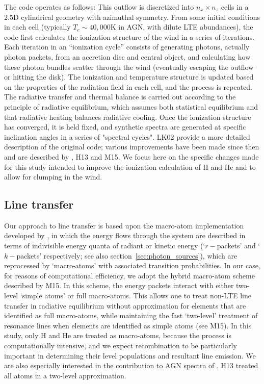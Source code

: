 \documentclass[useAMS,usenatbib]{mn2e_x}
\begin{document}
The code operates as follows:   This outflow is discretized into $n_x \times n_z$ cells in a 2.5D
cylindrical geometry with azimuthal symmetry. 
From some initial conditions in each cell (typically $T_e \sim 40,000$K in AGN, with 
dilute LTE abundances), 
the code first calculates the ionization structure of the wind in a series of iterations. 
Each iteration in an ``ionization cycle'' consists of generating photons, actually photon packets, 
from an accretion disc and central object, and calculating how these photon 
bundles scatter through the wind (eventually escaping the outflow or hitting the disk). 
The ionization and temperature structure is updated based on the properties of the 
radiation field in each cell, and the process is repeated. The radiative transfer and thermal
balance is carried out according to the principle of radiative equilibrium, 
which assumes both statistical equilibrium and that radiative heating balances radiative cooling.
Once the ionization structure has converged, it is held fixed, 
and synthetic spectra are generated at specific inclination 
angles in a series of "spectral cycles". LK02 provide a more detailed  
description of the original code; various improvements have been made 
since then and are described by \cite{simmacro2005}, H13 and M15.  
We focus here on the specific changes made for this study
intended to improve the ionization calculation of H and He
and to allow for clumping in the wind.


\subsection{Line transfer}

Our approach to line transfer is based upon the macro-atom implementation developed by 
\cite{lucy2002, lucy2003}, in which the energy flows through the system are described in 
terms of indivisible energy quanta of radiant or kinetic energy 
(`$r-$packets' and `$k-$packets' respectively; see also section~\ref{sec:photon_sources}),
which are reprocessed by `macro-atoms' with associated transition probabilities.
In our case, for reasons of computational efficiency, we adopt the  hybrid macro-atom scheme 
described by M15. In this scheme, the energy packets interact with either two-level 
`simple atoms' or full macro-atoms. 
This allows one to treat non-LTE line transfer in radiative equilibrium
without approximation for elements that are identified as 
full macro-atoms, while maintaining the fast `two-level' 
treatment of resonance lines when elements are identified 
as simple atoms (see M15). In this study,
only H and He are treated as macro-atoms, because the process is computationally
intensive, and we expect recombination to be particularly important
in determining their level populations and resultant line emission.
We are also especially interested in the contribution to 
AGN spectra of \LA.  H13 treated all atoms in a two-level approximation.  
\end{document}
